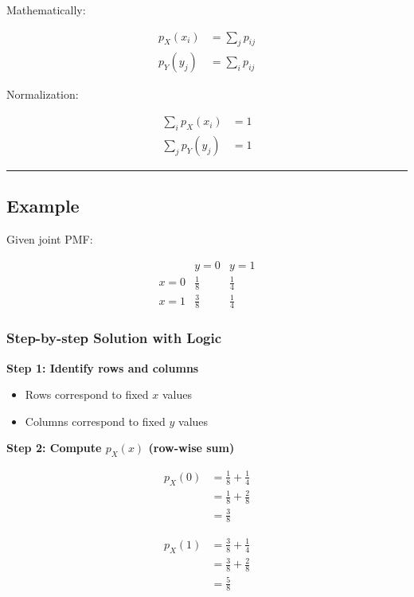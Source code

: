 \documentclass[12pt]{article}
\begin{document}
Mathematically:

\begin{align*}
p_X(x_i) &= \sum_j p_{ij} \\
p_Y(y_j) &= \sum_i p_{ij}
\end{align*}

Normalization:

\begin{align*}
\sum_i p_X(x_i) &= 1 \\
\sum_j p_Y(y_j) &= 1
\end{align*}

\hrule
\vspace{0.5cm}

\subsection{Example}

Given joint PMF:

\[
\begin{array}{c|cc}
 & y=0 & y=1 \\
\hline
x=0 & \frac{1}{8} & \frac{1}{4} \\
x=1 & \frac{3}{8} & \frac{1}{4}
\end{array}
\]

\subsubsection*{Step-by-step Solution with Logic}

\textbf{Step 1: Identify rows and columns}

\begin{itemize}
\item Rows correspond to fixed $x$ values
\item Columns correspond to fixed $y$ values
\end{itemize}

\textbf{Step 2: Compute $p_X(x)$ (row-wise sum)}

\begin{align*}
p_X(0) &= \frac{1}{8} + \frac{1}{4} \\
       &= \frac{1}{8} + \frac{2}{8} \\
       &= \frac{3}{8}
\end{align*}

\begin{align*}
p_X(1) &= \frac{3}{8} + \frac{1}{4} \\
       &= \frac{3}{8} + \frac{2}{8} \\
       &= \frac{5}{8}
\end{align*}
\end{document}
